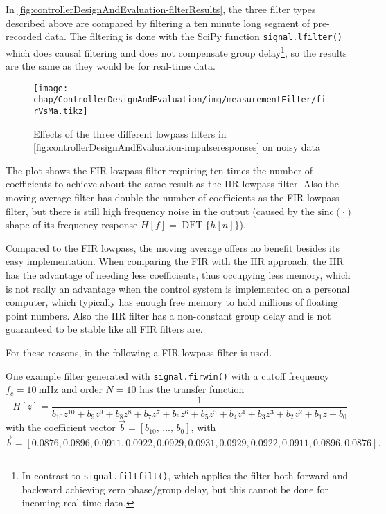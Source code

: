 In \autoref{fig:controllerDesignAndEvaluation-filterResults}, the three filter types described above are compared by filtering a ten minute long segment of pre-recorded data. The filtering is done with the SciPy function \texttt{signal.lfilter()} which does causal filtering and does not compensate group delay\footnote{In contrast to \texttt{signal.filtfilt()}, which applies the filter both forward and backward achieving zero phase/group delay, but this cannot be done for incoming real-time data.}, so the results are the same as they would be for real-time data.

\begin{figure}[tb]
	\centering
	\texttt{[image: chap/ControllerDesignAndEvaluation/img/measurementFilter/firVsMa.tikz]}
	\caption{Effects of the three different lowpass filters in \autoref{fig:controllerDesignAndEvaluation-impulseresponses} on noisy data}
	\label{fig:controllerDesignAndEvaluation-filterResults}
\end{figure}

The plot shows the FIR lowpass filter requiring ten times the number of coefficients to achieve about the same result as the IIR lowpass filter.
Also the moving average filter has double the number of coefficients as the FIR lowpass filter, but there is still high frequency noise in the output (caused by the $\text{sinc}(\cdot)$ shape of its frequency response $H[f]=\operatorname{DFT}\{h[n]\}$).

Compared to the FIR lowpass, the moving average offers no benefit besides its easy implementation.
When comparing the FIR with the IIR approach, the IIR has the advantage of needing less coefficients, thus occupying less memory, which is not really an advantage when the control system is implemented on a personal computer, which typically has enough free memory to hold millions of floating point numbers.
Also the IIR filter has a non-constant group delay and is not guaranteed to be stable like all FIR filters are.

For these reasons, in the following a FIR lowpass filter is used.

One example filter generated with \texttt{signal.firwin()} with a cutoff frequency $f_c=\SI{10}{\milli\hertz}$ and order $N=10$ has the transfer function
\begin{equation}
H[z]=\frac{1}{b_{10} z^{10} + b_{9} z^9 + b_{8} z^8 + b_{7} z^7 + b_{6} z^6 + b_{5} z^5 + b_{4} z^4 + b_{3} z^3  + b_{2} z^2 + b_{1} z + b_{0}}
\end{equation}
with the coefficient vector $\vec{b}=[b_{10},\,...,\,b_0]$, with
\begin{equation}
\vec{b}=[0.0876,0.0896,0.0911,0.0922,0.0929,0.0931,0.0929,0.0922,0.0911,0.0896,0.0876].
\end{equation}

